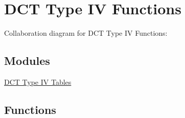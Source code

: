 \hypertarget{group__DCT4__IDCT4}{}\section{D\+CT Type IV Functions}
\label{group__DCT4__IDCT4}
Collaboration diagram for D\+CT Type IV Functions\+:
\subsection*{Modules}
\begin{DoxyCompactItemize}
\item 
\hyperlink{group__DCT4__IDCT4__Table}{D\+C\+T Type I\+V Tables}
\end{DoxyCompactItemize}
\subsection*{Functions}
